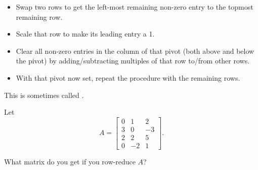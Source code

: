 \begin{itemize}
\item Swap two rows to get the left-most remaining non-zero entry to the topmost remaining row.  
\item Scale that row to make its leading entry a 1.    
\item Clear all non-zero entries in the column of that pivot (both above and below the pivot) by adding/subtracting multiples of that row to/from other rows.  
\item With that pivot now set, repeat the procedure with the remaining rows.  
\end{itemize}

This is sometimes called {}.  

\endedxtext



\endedxvertical





Let 
\[
A = \left[ \begin{array}{ccc} 0 & 1 & 2 \\ 3 & 0 & -3 \\ 2 & 2 & 5 \\ 0 & -2 & 1\end{array} \right]. \]

What matrix do you get if you row-reduce $A$? 




